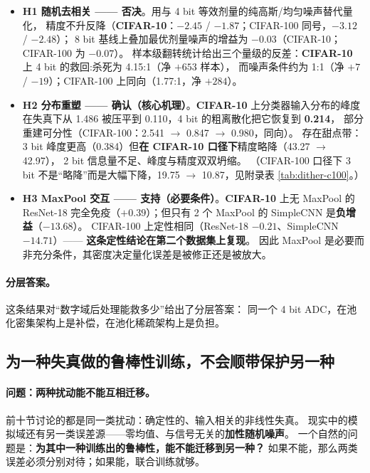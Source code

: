 \documentclass[11pt,a4paper]{ctexart}
\begin{document}
\begin{itemize}[leftmargin=2em,itemsep=2pt]
  \item \textbf{H1 随机去相关 —— 否决}。用与 4 bit 等效剂量的纯高斯/均匀噪声替代量化，
        精度不升反降（\textbf{CIFAR-10}：$-2.45$ / $-1.87$；CIFAR-100 同号，$-3.12$ / $-2.48$）；
        8 bit 基线上叠加最优剂量噪声的增益为 $-0.03$（CIFAR-10；CIFAR-100 为 $-0.07$）。
        样本级翻转统计给出三个量级的反差：\textbf{CIFAR-10} 上 4 bit 的救回:杀死为 4.15:1（净 $+653$ 样本），
        而噪声条件约为 1:1（净 $+7$ / $-19$）；CIFAR-100 上同向（1.77:1，净 $+284$）。
  \item \textbf{H2 分布重塑 —— 确认（核心机理）}。\textbf{CIFAR-10} 上分类器输入分布的峰度
        在失真下从 1.486 被压平到 0.110，4 bit 的粗离散化把它恢复到 \textbf{0.214}，
        部分重建可分性（CIFAR-100：2.541 $\to$ 0.847 $\to$ 0.980，同向）。
        存在甜点带：3 bit 峰度更高（0.384）但\textbf{在 CIFAR-10 口径下}精度略降（43.27 $\to$ 42.97），
        2 bit 信息量不足、峰度与精度双双坍缩。
        （CIFAR-100 口径下 3 bit 不是“略降”而是大幅下降，19.75 $\to$ 10.87，见附录表 \ref{tab:dither-c100}。）
  \item \textbf{H3 MaxPool 交互 —— 支持（必要条件）}。\textbf{CIFAR-10} 上无 MaxPool 的 ResNet-18
        完全免疫（$+0.39$）；但只有 2 个 MaxPool 的 SimpleCNN 是\textbf{负增益}（$-13.68$）。
        CIFAR-100 上定性相同（ResNet-18 $-0.21$、SimpleCNN $-14.71$）——
        \textbf{这条定性结论在第二个数据集上复现}。
        因此 MaxPool 是必要而非充分条件，其密度决定量化误差是被修正还是被放大。
\end{itemize}

\paragraph{分层答案。}
这条结果对“数字域后处理能救多少”给出了分层答案：
同一个 4 bit ADC，在池化密集架构上是补偿，在池化稀疏架构上是负担。

\subsection{为一种失真做的鲁棒性训练，不会顺带保护另一种}

\paragraph{问题：两种扰动能不能互相迁移。}
前十节讨论的都是同一类扰动：确定性的、输入相关的非线性失真。
现实中的模拟域还有另一类误差源——零均值、与信号无关的\textbf{加性随机噪声}。
一个自然的问题是：\textbf{为其中一种训练出的鲁棒性，能不能迁移到另一种？}
如果不能，那么两类误差必须分别对待；如果能，联合训练就够。
\end{document}
